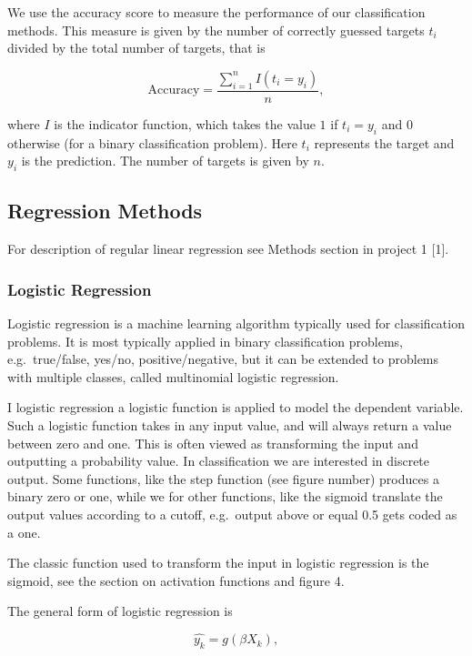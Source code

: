 \documentclass[11pt]{article}
\begin{document}
We use the accuracy score to measure the performance of our
classification methods. This measure is given by the number of correctly
guessed targets \(t_i\) divided by the total number of targets, that is

\[
\text{Accuracy} = \frac{\sum_{i=1}^n I(t_i = y_i)}{n} ,
\]

where \(I\) is the indicator function, which takes the value \(1\) if
\(t_i = y_i\) and \(0\) otherwise (for a binary classification problem).
Here \(t_i\) represents the target and \(y_i\) is the prediction. The
number of targets is given by \(n\).

    \hypertarget{regression-methods}{%
\subsection{Regression Methods}\label{regression-methods}}

For description of regular linear regression see Methods section in
project 1 {[}1{]}.

\hypertarget{logistic-regression}{%
\subsubsection{Logistic Regression}\label{logistic-regression}}

Logistic regression is a machine learning algorithm typically used for
classification problems. It is most typically applied in binary
classification problems, e.g.~true/false, yes/no, positive/negative, but
it can be extended to problems with multiple classes, called multinomial
logistic regression.

I logistic regression a logistic function is applied to model the
dependent variable. Such a logistic function takes in any input value,
and will always return a value between zero and one. This is often
viewed as transforming the input and outputting a probability value. In
classification we are interested in discrete output. Some functions,
like the step function (see figure number) produces a binary zero or
one, while we for other functions, like the sigmoid translate the output
values according to a cutoff, e.g.~output above or equal 0.5 gets coded
as a one.

The classic function used to transform the input in logistic regression
is the sigmoid, see the section on activation functions and figure 4.

The general form of logistic regression is

\[
\hat{y_k} = g(\beta X_k),
\]
\end{document}
